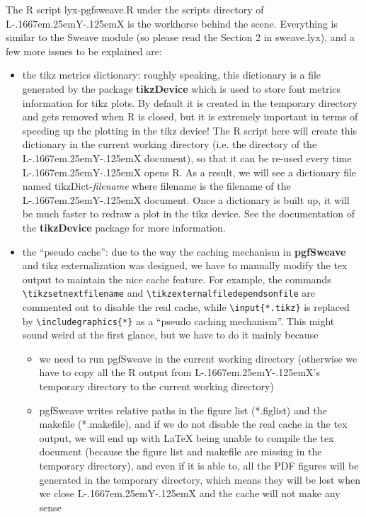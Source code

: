 \documentclass[english,noae,nogin]{article}
\makeatletter
\providecommand{\LyX}{\texorpdfstring%
  {L\kern-.1667em\lower.25em\hbox{Y}\kern-.125emX\@}
  {LyX}}
\makeatother
\begin{document}
The R script \textsf{lyx-pgfsweave.R} under the \textsf{scripts} directory
of \LyX{} is the workhorse behind the scene. Everything is similar
to the \textsf{Sweave} module (so please read the Section 2 in \textsf{sweave.lyx}),
and a few more issues to be explained are:
\begin{itemize}
\item the tikz metrics dictionary: roughly speaking, this dictionary is
a file generated by the package \textbf{tikzDevice} which is used
to store font metrics information for tikz plots. By default it is
created in the temporary directory and gets removed when R is closed,
but it is extremely important in terms of speeding up the plotting
in the tikz device! The R script here will create this dictionary
in the current working directory (i.e. the directory of the \LyX{}
document), so that it can be re-used every time \LyX{} opens R. As
a result, we will see a dictionary file named \textsf{tikzDict-}\textsf{\emph{filename}}
where \textsf{filename} is the filename of the \LyX{} document. Once
a dictionary is built up, it will be much faster to redraw a plot
in the tikz device. See the documentation of the \textbf{tikzDevice}
package for more information.
\item the ``pseudo cache'': due to the way the caching mechanism in \textbf{pgfSweave}
and tikz externalization was designed, we have to manually modify
the tex output to maintain the nice cache feature. For example, the
commands \texttt{\textbackslash{}tikzsetnextfilename} and \texttt{\textbackslash{}tikzexternalfiledependsonfile}
are commented out to disable the real cache, while \texttt{\textbackslash{}input\{{*}.tikz\}}
is replaced by \texttt{\textbackslash{}includegraphics\{{*}\}} as
a ``pseudo caching mechanism''. This might sound weird at the first
glance, but we have to do it mainly because 

\begin{itemize}
\item we need to run pgfSweave in the current working directory (otherwise
we have to copy all the R output from \LyX{}'s temporary directory
to the current working directory)
\item pgfSweave writes relative paths in the figure list (\textsf{{*}.figlist})
and the makefile (\textsf{{*}.makefile}), and if we do not disable
the real cache in the tex output, we will end up with \LaTeX{} being
unable to compile the tex document (because the figure list and makefile
are missing in the temporary directory), and even if it is able to,
all the PDF figures will be generated in the temporary directory,
which means they will be lost when we close \LyX{} and the cache will
not make any sense
\end{itemize}


\end{itemize}
\end{document}
